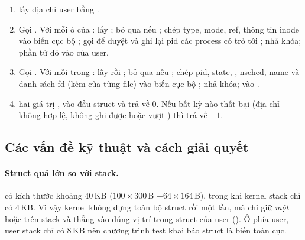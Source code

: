 \begin{enumerate}
  \item {} lấy địa chỉ user  bằng .
  \item Gọi . Với mỗi ô của
        :
        lấy ; bỏ qua nếu ; chép type, mode, ref,
        thông tin inode vào biến cục bộ ; gọi
         để duyệt  và ghi lại pid các process
        có  trỏ tới ; nhả khóa;  phần tử đó
        vào  của user.
  \item Gọi . Với mỗi  trong
        : lấy  rồi ; bỏ qua nếu
        ; chép pid, state, , nsched, name và danh
        sách fd (kèm  của từng file) vào biến cục bộ
        ; nhả khóa;  vào .
  \item {} hai giá trị ,  vào đầu struct và
        trả về 0. Nếu bất kỳ  nào thất bại (địa chỉ không hợp lệ,
        không ghi được hoặc vượt ) thì trả về $-1$.
\end{enumerate}

\subsection{Các vấn đề kỹ thuật và cách giải quyết}

\paragraph{Struct quá lớn so với stack.}
 có kích thước khoảng 40\,KB
($100 \times 300$\,B $+ 64 \times 164$\,B), trong khi kernel stack chỉ có 4\,KB.
Vì vậy kernel không dựng toàn bộ struct rồi  một lần, mà chỉ giữ
\emph{một}  hoặc  trên stack và 
thẳng vào đúng vị trí trong struct của user
(). Ở phía user, user
stack chỉ có 8\,KB nên chương trình test khai báo struct là biến
 toàn cục.

